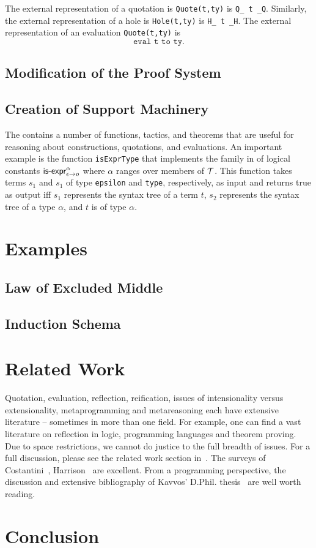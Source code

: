 \documentclass[fleqn]{llncs}
\begin{document}
The external representation of a quotation is \texttt{Quote(t,ty)} is
\texttt{Q\_ t \_Q}.  Similarly, the external representation of a hole
is \texttt{Hole(t,ty)} is \texttt{H\_ t \_H}.  The external
representation of an evaluation \texttt{Quote(t,ty)} is \[\texttt{eval
  t to ty}.\]

\subsection{Modification of the {\HL} Proof System}\label{subsec:proof-system}

\subsection{Creation of Support Machinery}\label{subsec:machinery}

The {\HLQE} contains a number of {\HOL} functions, tactics, and
theorems that are useful for reasoning about constructions,
quotations, and evaluations.  An important example is the {\HOL}
function \texttt{isExprType} that implements the family in {\churchqe}
of logical constants $\mbox{\sf is-expr}_{\epsilon \rightarrow o}^{\alpha}$
where $\alpha$ ranges over members of $\mbox{$\cal T$}$.  This function takes
terms $s_1$ and $s_1$ of type \texttt{epsilon} and \texttt{type},
respectively, as input and returns true as output iff $s_1$ represents
the syntax tree of a term $t$, $s_2$ represents the syntax tree of a
type $\alpha$, and $t$ is of type $\alpha$.


\section{Examples}\label{sec:examples}

\subsection{Law of Excluded Middle}

\subsection{Induction Schema}

\section{Related Work}\label{sec:related-work}

Quotation, evaluation, reflection, reification, issues of
intensionality versus extensionality, metaprogramming and
metareasoning each have extensive literature -- sometimes
in more than one field.  For example, one can find a
vast literature on reflection in logic, programming languages
and theorem proving. Due to space restrictions, we cannot
do justice to the full breadth of issues. For a full discussion,
please see the related work section in~\cite{FarmerArxiv17}.
The surveys of Costantini~\cite{Costantini02},
Harrison~\cite{Harrison95} are excellent. From a
programming perspective, the discussion and extensive 
bibliography of Kavvos' D.Phil. thesis~\cite{Kavvos2017}
are well worth reading.

\section{Conclusion}\label{sec:conclusion}




\setcounter{tocdepth}{1}
\listoftodos
\setcounter{tocdepth}{0}
\end{document}
